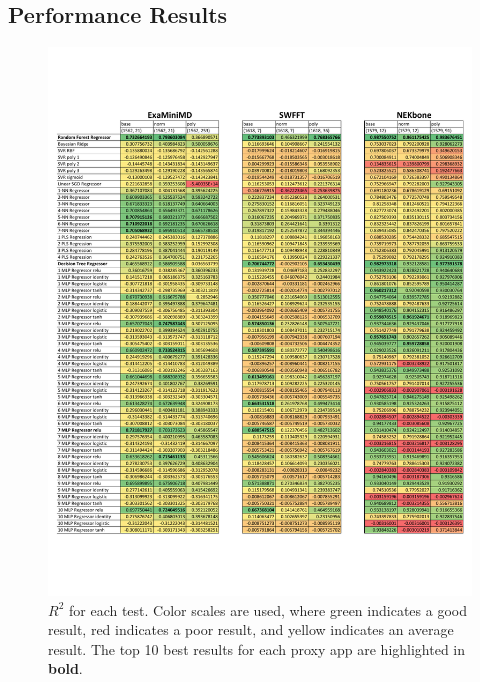 \documentclass[conference, 10pt, onecolumn, draftclsnofoot]{IEEEtran}
\begin{document}
\subsection{Performance Results}

\begin{figure}
    \centering
    \includegraphics[width=\columnwidth]{Figures/R2.pdf}
    \caption{$R^2$ for each test. Color scales are used, where green indicates a good result, red indicates a poor result, and yellow indicates an average result. The top 10 best results for each proxy app are highlighted in \textbf{bold}.}
    \label{fig:R2}
\end{figure}
\end{document}
